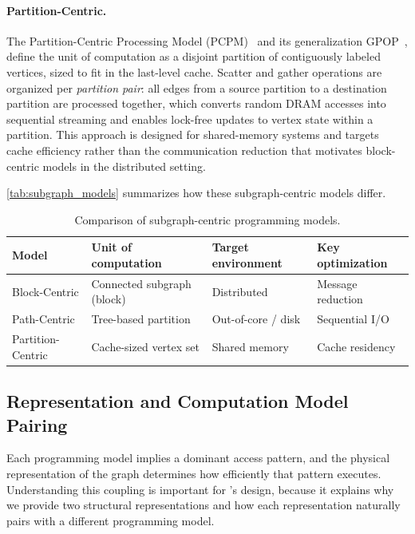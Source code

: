 \paragraph{Partition-Centric.}
The Partition-Centric Processing Model (PCPM)~\cite{lakhotia2018accelerating} and its generalization GPOP~\cite{lakhotia2020gpop}, define the unit of computation as a disjoint partition of contiguously labeled vertices, sized to fit in the last-level cache.
Scatter and gather operations are organized per \emph{partition pair}: all edges from a source partition to a destination partition are processed together, which converts random DRAM accesses into sequential streaming and enables lock-free updates to vertex state within a partition.
This approach is designed for shared-memory systems and targets cache efficiency rather than the communication reduction that motivates block-centric models in the distributed setting.

\autoref{tab:subgraph_models} summarizes how these subgraph-centric models differ.

\begin{table}[t]
\centering
\small
\begin{tabular}{llll}
\toprule
\textbf{Model} & \textbf{Unit of computation} & \textbf{Target environment} & \textbf{Key optimization} \\
\midrule
Block-Centric  & Connected subgraph (block) & Distributed & Message reduction \\
Path-Centric   & Tree-based partition       & Out-of-core / disk & Sequential I/O \\
Partition-Centric & Cache-sized vertex set  & Shared memory & Cache residency \\
\bottomrule
\end{tabular}
\caption{Comparison of subgraph-centric programming models.}
\label{tab:subgraph_models}
\end{table}

\subsection{Representation and Computation Model Pairing}
\label{design:rep_comp_pairing}

Each programming model implies a dominant access pattern, and the physical representation of the graph determines how efficiently that pattern executes.
Understanding this coupling is important for \project{}'s design, because it explains why we provide two structural representations and how each representation naturally pairs with a different programming model.

